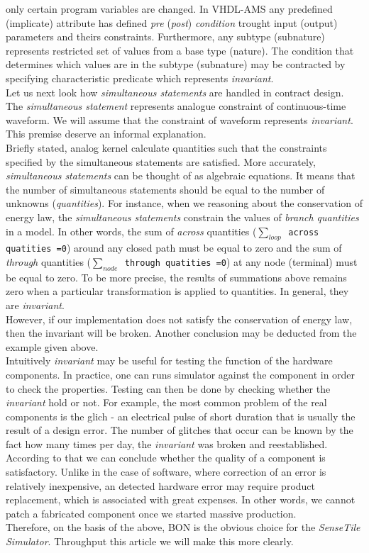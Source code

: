 \documentclass{article}
\newcommand{\STS}{\emph{SenseTile Simulator}\xspace}
\newcommand{\inv}{\emph{invariant}\xspace}
\newcommand{\arcoss}{\emph{across}\xspace}
\newcommand{\through}{\emph{through}\xspace}
\begin{document}
only certain program variables are changed.
In VHDL-AMS any predefined (implicate) attribute 
has defined \emph{pre} (\emph{post}) \emph{condition} trought input (output)
parameters and theirs constraints. Furthermore, any subtype (subnature)
represents restricted set of values from a base type (nature).
The condition that determines which values are in the subtype (subnature) 
may be contracted by specifying characteristic predicate which represents \inv.\\
Let us next look how \emph{simultaneous statements} are handled in contract design.
The \emph{simultaneous statement} represents analogue constraint of
continuous-time waveform. We will assume that the constraint of waveform
represents \inv. This premise deserve an informal explanation.\\
Briefly stated, analog kernel calculate quantities such
that the constraints specified by the simultaneous statements are satisfied.
More accurately, \emph{simultaneous statements} can be thought of as
algebraic equations. It means that the number of simultaneous statements
should be equal to the number of unknowns (\emph{quantities}). 
For instance, when we reasoning about the conservation of energy law,
the \emph{simultaneous statements} constrain the values of \emph{branch quantities}
in a model.
In other words, the sum of \arcoss quantities (\texttt{$\sum_{loop}$ across quatities =0})
around any closed path must be equal to zero and the sum of \through
quantities (\texttt{$\sum_{node}$ through quatities =0}) at any node
(terminal) must be equal to zero. To be more precise, the results of summations 
above remains zero when a particular transformation is applied to quantities.
In general, they are \inv. \\
However, if our implementation does not satisfy the conservation of energy law, 
 then the invariant will be broken. 
Another conclusion may be deducted from the example given above.\\
Intuitively \inv may be useful for testing the function of the hardware components.
In practice, one can runs simulator against the component in order to check 
the properties. Testing can then be done by checking whether the \inv hold or not.
For example, the most common problem of the real components is the glich - an electrical pulse 
of short duration that is usually the result of a design error.
The number of glitches that occur can be known by the fact how many times per day, 
the \inv was broken and reestablished. According to that we can conclude whether the 
quality of a component is satisfactory. Unlike in the case of software, where 
correction of an error is relatively inexpensive, an detected hardware error 
may require product replacement, which is associated with great expenses. 
In other words, we cannot patch a fabricated component once we started massive production. \\
Therefore, on the basis of the above, BON is the obvious choice
for the \STS.
Throughput this article we will make this more clearly. 
\end{document}
